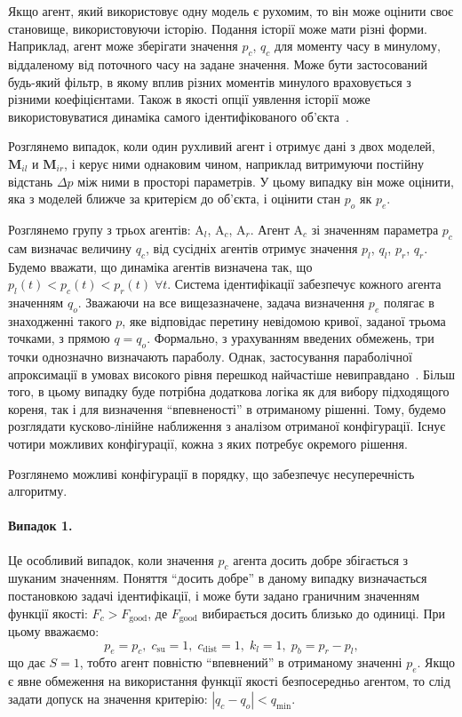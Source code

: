 Якщо агент, який використовує одну модель є рухомим, то він може
оцінити своє становище, використовуючи історію. Подання історії
може мати різні форми. Наприклад, агент може зберігати значення
$p_c$,
$q_c$ для моменту часу в минулому, віддаленому від поточного часу
на задане значення. Може бути застосований будь-який
фільтр, в якому вплив різних моментів минулого враховується з
різними коефіцієнтами. Також в якості опції уявлення історії
може використовуватися динаміка самого ідентифікованого
об'єкта~\cite{mich_92}.

Розглянемо випадок, коли один рухливий агент і отримує дані з
двох моделей,
$\mathbf{M}_{il}$ и
$\mathbf{M}_{ir}$,
і керує ними однаковим чином, наприклад витримуючи постійну
відстань
$\Delta p$ між ними в просторі параметрів. У цьому випадку він може
оцінити, яка з моделей ближче за критерієм до об'єкта, і оцінити стан
$p_o$ як $ p_e$.

Розглянемо групу з трьох агентів:
$\mathrm{A}_l$,
$\mathrm{A}_c$,
$\mathrm{A}_r$.
Агент $\mathrm{A}_c$ зі значенням параметра $p_c$ сам визначає величину
$q_c$, від сусідніх агентів отримує значення $p_l$, $q_l$, $p_r$, $q_r$.
Будемо вважати, що динаміка агентів визначена так, що
$p_l(t) < p_c(t) < p_r(t) \; \forall t$.
Система ідентифікації забезпечує кожного агента
значенням $q_o$.
Зважаючи на все вищезазначене,
задача
визначення $p_e$ полягає в знаходженні такого $p$, яке відповідає перетину
невідомою кривої, заданої трьома точками, з прямою $q = q_o$.
Формально, з урахуванням введених обмежень, три точки однозначно визначають параболу. Однак,
застосування параболічної апроксимації в умовах високого рівня перешкод
найчастіше невиправдано~\cite{atu_asau27}.
Більш того, в цьому випадку буде потрібна додаткова
логіка як для вибору підходящого кореня, так і для визначення ``впевненості''
в отриманому рішенні.
Тому, будемо розглядати кусково-лінійне наближення з
аналізом отриманої конфігурації. Існує чотири можливих конфігурації,
кожна з яких потребує окремого рішення.

Розглянемо можливі конфігурації в порядку, що забезпечує
несуперечність алгоритму.

\paragraph{Випадок 1.}
Це особливий випадок, коли значення
$p_c$ агента досить добре збігається з шуканим значенням. Поняття
``досить добре'' в даному випадку визначається постановкою
задачі ідентифікації, і може бути задано граничним значенням функції якості:
$F_c> F_{\mathrm{good}}$, де
$F_{\mathrm{good}}$ вибирається досить близько до одиниці. При цьому
вважаємо:
%
\[
p_e = p_c, \; c_\mathrm{su} = 1, \;  c_\mathrm{dist} = 1, \;  k_l = 1, \;  p_b = p_r - p_l,
\]
%
що дає
$S = 1$, тобто агент повністю ``впевнений'' в отриманому значенні
$p_e$. Якщо є явне обмеження на використання функції якості
безпосередньо агентом, то слід задати допуск на значення
критерію:
$|q_c-q_o| < q_{\min}$.

